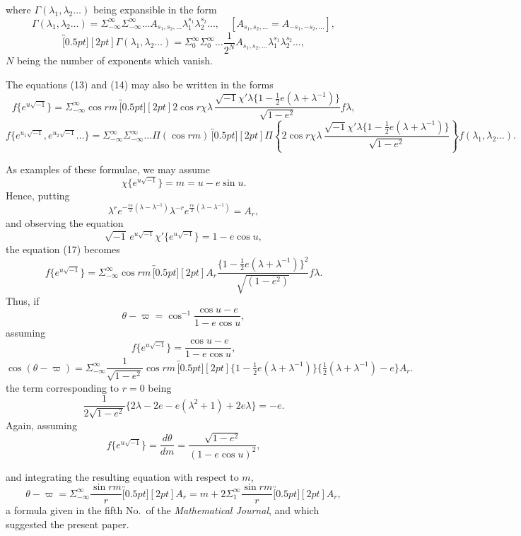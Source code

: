 \documentclass[11pt]{article}
\providecommand{\br}[1]{\overbracket[0.5pt][2pt]{#1}}
\providecommand{\half}{\tfrac12}
\begin{document}
\clearpage

where $\Gamma(\lambda_{1},\lambda_{2}\ldots)$ being expansible in the form
\[
\Gamma(\lambda_{1},\lambda_{2}\ldots)
=\Sigma_{-\infty}^{\infty}\Sigma_{-\infty}^{\infty}\ldots
A_{s_1,s_2,\ldots}\lambda_1^{s_1}\lambda_2^{s_2}\ldots,
\quad [A_{s_1,s_2,\ldots}=A_{-s_1,-s_2,\ldots}], \tag{15}
\]
\[
\br{\Gamma(\lambda_{1},\lambda_{2}\ldots)}
=\Sigma_{0}^{\infty}\Sigma_{0}^{\infty}\ldots
\frac{1}{2^{N}}A_{s_1,s_2,\ldots}\lambda_1^{s_1}\lambda_2^{s_2}\ldots,
\tag{16}
\]
$N$ being the number of exponents which vanish.

The equations (13) and (14) may also be written in the forms
\[
f\{e^{u\sqrt{-1}}\}
=\Sigma_{-\infty}^{\infty}\cos rm\,
\br{
2\cos r\chi\lambda\,
\frac{\sqrt{-1}\chi'\lambda\{1-\half e(\lambda+\lambda^{-1})\}}{\sqrt{1-e^{2}}}
f\lambda
} \tag{17},
\]
\[
f\{e^{u_1\sqrt{-1}},e^{u_2\sqrt{-1}}\ldots\}
=\Sigma_{-\infty}^{\infty}\Sigma_{-\infty}^{\infty}\ldots
\Pi(\cos rm)\,
\br{\Pi\left\{
2\cos r\chi\lambda\,
\frac{\sqrt{-1}\chi'\lambda\{1-\half e(\lambda+\lambda^{-1})\}}
{\sqrt{1-e^{2}}}
\right\}f(\lambda_1,\lambda_2\ldots)}. \tag{18}
\]

As examples of these formulae, we may assume
\[
\chi\{e^{u\sqrt{-1}}\}=m=u-e\sin u \tag{19}.
\]
Hence, putting
\[
\lambda^{r}e^{-\frac{re}{2}(\lambda-\lambda^{-1})}
\lambda^{-r}e^{\frac{re}{2}(\lambda-\lambda^{-1})}=A_r, \tag{20}
\]
and observing the equation
\[
\sqrt{-1}\,e^{u\sqrt{-1}}\chi'\{e^{u\sqrt{-1}}\}=1-e\cos u, \tag{21}
\]
the equation (17) becomes
\[
f\{e^{u\sqrt{-1}}\}
=\Sigma_{-\infty}^{\infty}\cos rm\,\br{
A_r\frac{\{1-\half e(\lambda+\lambda^{-1})\}^{2}}{\sqrt{(1-e^{2})}}f\lambda
}. \tag{22}
\]
Thus, if
\[
\theta-\varpi=\cos^{-1}\frac{\cos u-e}{1-e\cos u} \tag{23},
\]
assuming
\[
f\{e^{u\sqrt{-1}}\}=\frac{\cos u-e}{1-e\cos u}, \tag{24}
\]
\[
\cos(\theta-\varpi)=
\Sigma_{-\infty}^{\infty}
\frac{1}{\sqrt{1-e^{2}}}\cos rm\,
\br{\{1-\half e(\lambda+\lambda^{-1})\}\{\half(\lambda+\lambda^{-1})-e\}A_r}. \tag{25}
\]
the term corresponding to $r=0$ being
\[
\frac{1}{2\sqrt{1-e^{2}}}\{2\lambda-2e-e(\lambda^{2}+1)+2e\lambda\}=-e. \tag{26}
\]
Again, assuming
\[
f\{e^{u\sqrt{-1}}\}=\frac{d\theta}{dm}
=\frac{\sqrt{1-e^{2}}}{(1-e\cos u)^{2}} \tag{27},
\]

\clearpage

and integrating the resulting equation with respect to $m$,
\[
\theta-\varpi=
\Sigma_{-\infty}^{\infty}\frac{\sin rm}{r}\br{A_r}
=m+2\Sigma_{1}^{\infty}\frac{\sin rm}{r}\br{A_r}, \tag{28}
\]
a formula given in the fifth No.\ of the \textit{Mathematical Journal}, and which suggested the
present paper.
\end{document}
